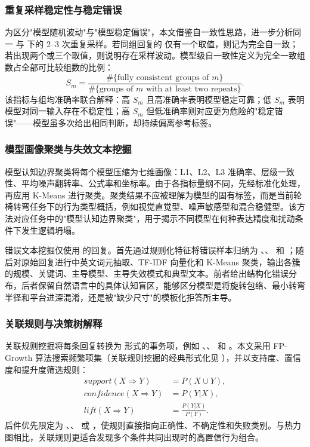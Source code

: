 \subsubsection{重复采样稳定性与稳定错误}

为区分"模型随机波动"与"模型稳定偏误"，本文借鉴自一致性思路\cite{wang2023self}，进一步分析同一  与  下的 2--3 次重复采样。若同组回复的  仅有一个取值，则记为完全自一致；若出现两个或三个取值，则说明存在采样波动。模型级自一致性定义为完全一致组数占全部可比较组数的比例：
\[
S_m=\frac{\#\{\text{fully consistent groups of }m\}}{\#\{\text{groups of }m\text{ with at least two repeats}\}}.
\]
该指标与组均准确率联合解释：高 $S_m$ 且高准确率表明模型稳定可靠；低 $S_m$ 表明模型对同一输入存在不稳定性；高 $S_m$ 但低准确率则对应更为危险的"稳定错误"——模型虽多次给出相同判断，却持续偏离参考标签。

\subsubsection{模型画像聚类与失效文本挖掘}

模型认知边界聚类将每个模型压缩为七维画像：L1、L2、L3 准确率、层级一致性、平均噪声翻转率、公式率和坐标率。由于各指标量纲不同，先经标准化处理，再应用 K-Means 进行聚类。聚类结果不应被理解为模型的固有标签，而是当前轮椅转弯任务下的行为类型概括，例如视觉直觉型、噪声敏感型和混合稳健型。该方法对应任务中的"模型认知边界聚类"，用于揭示不同模型在何种表达精度和扰动条件下发生逻辑坍塌。

错误文本挖掘仅使用  的回复。首先通过规则化特征将错误样本归纳为 、、 和 ；随后对原始回复进行中英文词元抽取、TF-IDF 向量化和 K-Means 聚类，输出各簇的规模、关键词、主导模型、主导失效模式和典型文本。前者给出结构化错误分布，后者保留自然语言中的具体认知盲区，能够区分模型是将旋转包络、最小转弯半径和平台进深混淆，还是被"缺少尺寸"的模板化拒答所主导。

\subsubsection{关联规则与决策树解释}

关联规则挖掘将每条回复转换为  形式的事务项，例如 、、 和 。本文采用 FP-Growth 算法\cite{han2000mining}搜索频繁项集（关联规则挖掘的经典形式化见 \citeauthor{agrawal1993mining}\cite{agrawal1993mining}），并以支持度、置信度和提升度筛选规则：
\[
\begin{aligned}
support(X\Rightarrow Y)&=P(X\cup Y),\\
confidence(X\Rightarrow Y)&=P(Y|X),\\
lift(X\Rightarrow Y)&=\frac{P(Y|X)}{P(Y)}.
\end{aligned}
\]
后件优先限定为 、、 或 ，使规则直接指向正确性、不确定性和失败类别。与热力图相比，关联规则更适合发现多个条件共同出现时的高置信行为组合。

